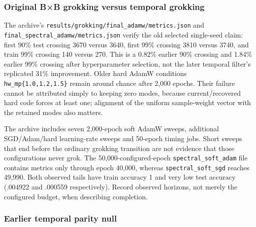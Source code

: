 \documentclass[
  british,
  10pt,
  a4paper,
]{article}
\begin{document}
\subsubsection{Original B×B grokking versus temporal
grokking}\label{classical-evidence--original-bb-grokking-versus-temporal-grokking}

The archive's
\texttt{results/\allowbreak{}grokking/\allowbreak{}final\_\allowbreak{}adamw/\allowbreak{}metrics.\allowbreak{}json}
and
\texttt{final\_\allowbreak{}spectral\_\allowbreak{}adamw/\allowbreak{}metrics.\allowbreak{}json}
verify the old selected single-\allowbreak{}seed claim: first 90\% test
crossing 3670 versus 3640, first 99\% crossing 3810 versus 3740, and
train 99\% crossing 140 versus 270. This is a 0.82\% earlier 90\%
crossing and 1.84\% earlier 99\% crossing after hyperparameter
selection, not the later temporal filter's replicated 31\%
improvement.\allowbreak{} Older hard AdamW conditions
\texttt{hw\_\allowbreak{}mp\{\allowbreak{}1.\allowbreak{}0,\allowbreak{}1.\allowbreak{}2,\allowbreak{}1.\allowbreak{}5\}\allowbreak{}}
remain around chance after 2,000 epochs. Their failure cannot be
attributed simply to keeping zero modes, because
current/\allowbreak{}recovered hard code forces at least one; alignment
of the uniform sample-\allowbreak{}weight vector with the retained modes
also matters.

The archive includes seven 2,\allowbreak{}000-\allowbreak{}epoch soft
AdamW sweeps, additional SGD/\allowbreak{}Adam/\allowbreak{}hard
learning-\allowbreak{}rate sweeps and 50-epoch timing jobs. Short sweeps
that end before the ordinary grokking transition are not evidence that
those configurations never grok. The
50,\allowbreak{}000-\allowbreak{}configured-\allowbreak{}epoch
\texttt{spectral\_\allowbreak{}soft\_\allowbreak{}adam} file contains
metrics only through epoch 40,000, whereas
\texttt{spectral\_\allowbreak{}soft\_\allowbreak{}sgd} reaches 49,990.
Both observed tails have train accuracy 1 and very low test accuracy
(.004922 and .000559 respectively\allowbreak{}).\allowbreak{} Record
observed horizons, not merely the configured budget, when describing
completion.\allowbreak{}

\subsubsection{Earlier temporal parity
null}\label{classical-evidence--earlier-temporal-parity-null}
\end{document}
